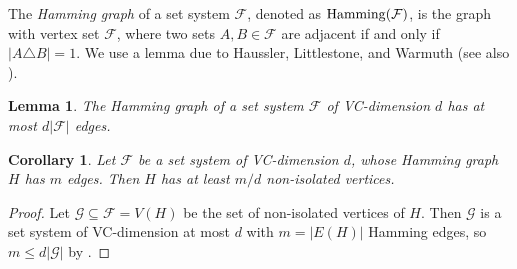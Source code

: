 \documentclass[11pt]{article}
\newtheorem{corollary}[theorem]{Corollary}
\newtheorem{lemma}[theorem]{Lemma}
\theoremstyle{definition}
\renewcommand{\le}{\leqslant}
\renewcommand{\ge}{\geqslant}
\renewcommand{\subset}{\subseteq}
\newcommand{\set}[1]{\{#1\}}
\newcommand{\setof}[2]{\set{#1 \,|\, #2 }}
\renewcommand{\cal}{\mathcal}
\begin{document}

The \emph{Hamming graph} of a set system $\cal F$, denoted as $\hamming(\cal F)$, is 
  the graph with vertex set $\cal F$, where two sets 
  $A,B\in\cal F$ are adjacent if and only if $|A\triangle B|=1$.
We use a lemma due to Haussler, Littlestone, and Warmuth \cite[Lemma 2.4]{Haussler1994} (see also \cite[Lemma 2]{Haussler95}). 
\begin{lemma}\label{lem:hamming-deg}
  The Hamming graph of a set system $\cal F$ of VC-dimension $d$ has at most $d|\cal F|$ edges.
\end{lemma}
\begin{corollary}\label{cor:hamming}
  Let $\cal F$ be a set system of VC-dimension $d$, whose Hamming graph $H$ has $m$ edges. Then $H$ has at least $m/d$ non-isolated vertices.
\end{corollary}
\begin{proof}
  Let $\cal G\subset \cal F=V(H)$ be the set of non-isolated vertices of $H$.
  Then $\cal G$ is a set system of VC-dimension at most $d$ with $m=|E(H)|$ Hamming edges,
so $m\le d|\cal G|$ by .
\end{proof}


\end{document}

